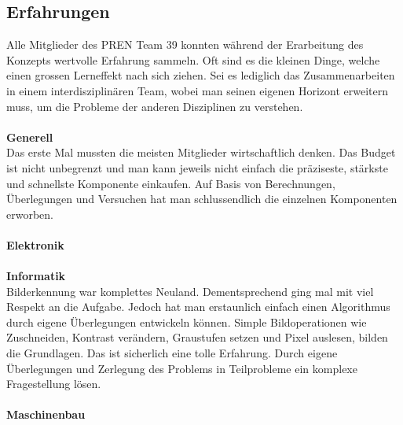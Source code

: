 \subsection{Erfahrungen}
Alle Mitglieder des PREN Team 39 konnten während der Erarbeitung des Konzepts wertvolle Erfahrung sammeln. Oft sind es die kleinen Dinge, welche einen grossen Lerneffekt nach sich ziehen. Sei es lediglich das Zusammenarbeiten in einem interdisziplinären Team, wobei man seinen eigenen Horizont erweitern muss, um die Probleme der anderen Disziplinen zu verstehen.\\
\\
\textbf{Generell}\\
Das erste Mal mussten die meisten Mitglieder wirtschaftlich denken. Das Budget ist nicht unbegrenzt und man kann jeweils nicht einfach die präziseste, stärkste und schnellste Komponente einkaufen. Auf Basis von Berechnungen, Überlegungen und Versuchen hat man schlussendlich die einzelnen Komponenten erworben.\\
\\
\textbf{Elektronik}\\
\\
\textbf{Informatik}\\
Bilderkennung war komplettes Neuland. Dementsprechend ging mal mit viel Respekt an die Aufgabe. Jedoch hat man erstaunlich einfach einen Algorithmus durch eigene Überlegungen entwickeln können. Simple Bildoperationen wie Zuschneiden, Kontrast verändern, Graustufen setzen und Pixel auslesen, bilden die Grundlagen. Das ist sicherlich eine tolle Erfahrung. Durch eigene Überlegungen und Zerlegung des Problems in Teilprobleme ein komplexe Fragestellung lösen.\\
\\
\textbf{Maschinenbau}\\
